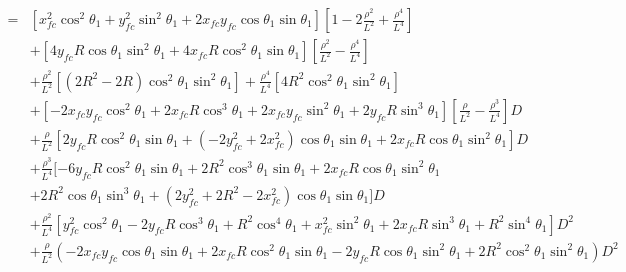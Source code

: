 \documentclass[12pt]{article}
\begin{document}
\begin{align}
    =& [x_{fc}^2\cos^2\theta_1  + y_{fc}^2\sin^2\theta_1 + 2x_{fc}y_{fc}\cos\theta_1\sin\theta_1][ 1 -2\frac{\rho^2}{L^2} + \frac{\rho^4}{L^4} ] \nonumber\\
    &+  [ 4y_{fc}R\cos\theta_1\sin^2\theta_1 + 4x_{fc}R\cos^2\theta_1\sin\theta_1 ][ \frac{\rho^2}{L^2} - \frac{\rho^4}{L^4} ] \nonumber\\
    &+ \frac{\rho^2}{L^2}[(2R^2-2R)\cos^2\theta_1\sin^2\theta_1] + \frac{\rho^4}{L^4}[ 4R^2\cos^2\theta_1\sin^2\theta_1  ] \nonumber\\
    &+ [ -2x_{fc}y_{fc}\cos^2\theta_1 +2x_{fc}R\cos^3\theta_1 + 2x_{fc}y_{fc}\sin^2\theta_1 + 2y_{fc}R\sin^3\theta_1 ][ \frac{\rho}{L^2} - \frac{\rho^3}{L^4}  ]D \nonumber\\
    &+ \frac{\rho}{L^2}[2y_{fc}R\cos^2\theta_1\sin\theta_1 + (-2y_{fc}^2 + 2x_{fc}^2)\cos\theta_1\sin\theta_1 + 2x_{fc}R\cos\theta_1\sin^2\theta_1 ]D \nonumber\\
    &+ \frac{\rho^3}{L^4}[ -6y_{fc}R\cos^2\theta_1\sin\theta_1 +2R^2\cos^3\theta_1\sin\theta_1 + 2x_{fc}R\cos\theta_1\sin^2\theta_1 \nonumber\\
    &+ 2R^2\cos\theta_1\sin^3\theta_1 +  (2y_{fc}^2 +2R^2 -2x_{fc}^2)\cos\theta_1\sin\theta_1  ]D \nonumber\\
    &+ \frac{\rho^2}{L^4}[y_{fc}^2\cos^2\theta_1 -2y_{fc}R\cos^3\theta_1 +R^2\cos^4\theta_1 + x_{fc}^2\sin^2\theta_1 + 2x_{fc}R\sin^3\theta_1 + R^2\sin^4\theta_1]D^2 \nonumber\\
    &+ \frac{\rho}{L^2}(-2x_{fc}y_{fc}\cos\theta_1\sin\theta_1 + 2x_{fc}R\cos^2\theta_1\sin\theta_1 -2y_{fc}R\cos\theta_1\sin^2\theta_1 +  2R^2\cos^2\theta_1\sin^2\theta_1 )D^2
\end{align}
\end{document}
